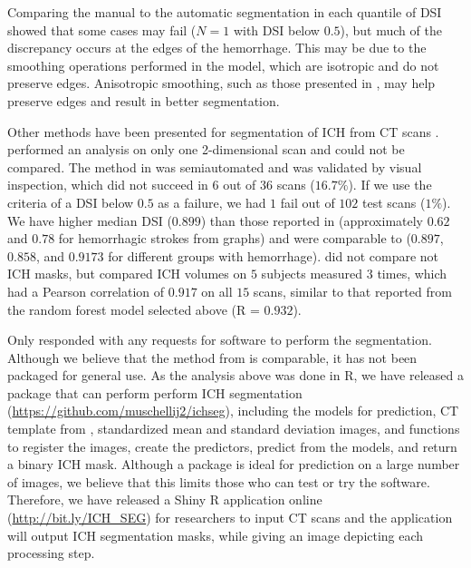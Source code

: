 \documentclass{elsarticle_nonatbib}\usepackage[]{graphicx}\usepackage[]{color}
\begin{document}
Comparing the manual to the automatic segmentation in each quantile of DSI showed that some cases may fail ($N = 1$ with DSI below $0.5$), but much of the discrepancy occurs at the edges of the hemorrhage.  This may be due to the smoothing operations performed in the model, which are isotropic and do not preserve edges.  Anisotropic smoothing, such as those presented in \citet{perona1994anisotropic}, may help preserve edges and result in better segmentation.  



Other methods have been presented for segmentation of ICH from CT scans \citep{ gillebert_automated_2014, prakash_segmentation_2012, loncaric_hierarchical_1996, loncaric_quantitative_1999, perez_set_2007}.  \citet{loncaric_hierarchical_1996} performed an analysis on only one 2-dimensional scan and could not be compared.  The method in \citet{perez_set_2007} was semiautomated and was validated by visual inspection, which did not succeed in $6$ out of $36$ scans ($16.7\%$).  If we use the criteria of a DSI below $0.5$ as a failure, we had $1$ fail out of $102$ test scans ($1\%$).  We have higher median DSI ($0.899$) than those reported in \citet{gillebert_automated_2014} (approximately $0.62$ and $0.78$ for hemorrhagic strokes from graphs) and were comparable to \citep{prakash_segmentation_2012} ($0.897$, $0.858$, and $0.9173$ for different groups with hemorrhage). \citet{loncaric_quantitative_1999} did not compare not ICH masks, but compared ICH volumes on $5$ subjects measured $3$ times, which had a Pearson correlation of $0.917$ on all $15$ scans, similar to that reported from the random forest model selected above (R = $0.932$).  

Only \citet{gillebert_automated_2014} responded with any requests for software to perform the segmentation.  Although we believe that the method from \citet{gillebert_automated_2014} is comparable, it has not been packaged for general use.  As the analysis above was done in R, we have released a package that can perform perform ICH segmentation (\url{https://github.com/muschellij2/ichseg}), 
including the models for prediction, CT template from \citet{rorden_age-specific_2012}, standardized mean and standard deviation images, and functions to register the images, create the predictors, predict from the models, and return a binary ICH mask.  Although a package is ideal for prediction on a large number of images, we believe that this limits those who can test or try the software.  Therefore, we have released a Shiny \citep{shiny} R application online (\url{http://bit.ly/ICH_SEG}) for researchers to input CT scans and the application will output ICH segmentation masks, while giving an image depicting each processing step.  
\end{document}
